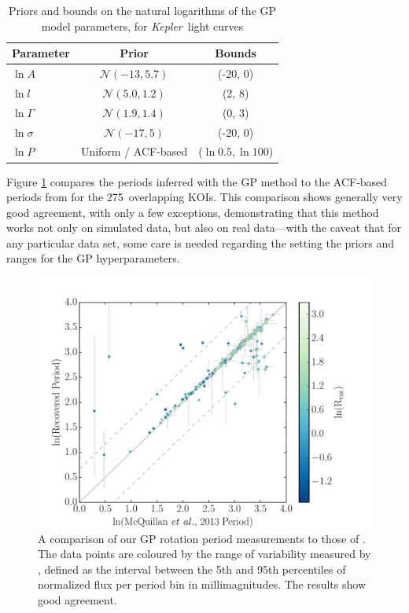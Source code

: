 \documentclass[useAMS, usenatbib, preprint, 12pt]{aastex}
\newcommand{\Kepler}{{\it Kepler}}
\newcommand{\nkoimcq}{275}
\begin{document}
\begin{table}
\begin{center}
\caption{Priors and bounds on the natural logarithms of the GP model parameters,
        for \Kepler\ light curves}
\begin{tabular}{lcc}
Parameter & Prior & Bounds\\
    \hline
    $\ln A$ & $\mathcal N(-13, 5.7)$ & (-20, 0) \\
    $\ln l$ & $\mathcal N(5.0, 1.2)$ & (2, 8) \\
    $\ln \Gamma$ & $\mathcal N(1.9, 1.4)$ & (0, 3) \\
    $\ln \sigma$ & $\mathcal N(-17, 5)$ & (-20, 0) \\
    $\ln P $ & Uniform / ACF-based & ($\ln 0.5, \ln 100$) \\
\end{tabular}
\end{center}
\end{table}
\label{tab:koipriors}

Figure \ref{fig:mcquillan} compares the periods inferred with the GP method to
the ACF-based periods from \citet{Mcquillan2013} for the \nkoimcq\ overlapping
KOIs.
This comparison shows generally very good agreement, with only a few
exceptions, demonstrating that this method works not only on simulated data,
but also on real data---with the caveat that for any particular data set, some
care is needed regarding the setting the priors and ranges for the GP
hyperparameters.

\begin{figure}
\begin{center}
\includegraphics[width=6in, clip=true]{figures/comparison_koi_02_03.pdf}
\caption[Comparison with McQuillan results.]
{A comparison of our GP rotation period measurements to those of
\citet{Mcquillan2014}.
The data points are coloured by the range of variability measured by
    \citet{Mcquillan2014}, defined as the interval between the 5th and 95th
    percentiles of normalized flux per period bin in millimagnitudes.
    The results show good agreement.}
\label{fig:mcquillan}
\end{center}
\end{figure}
\end{document}
